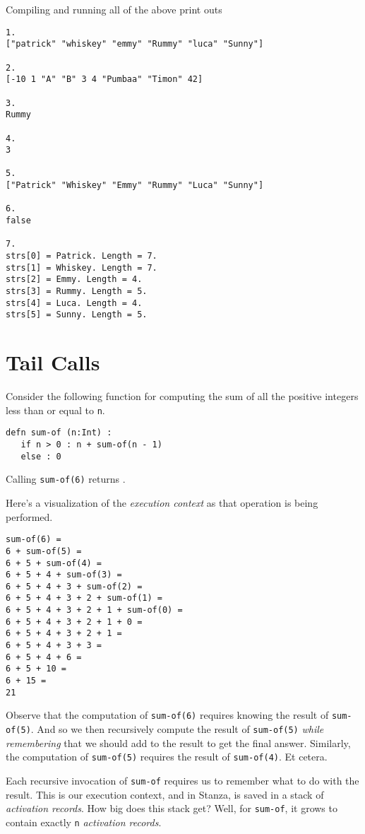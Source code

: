 \documentclass[10pt,oneside]{book}
\begin{document}
Compiling and running all of the above print outs
\begin{lstlisting}
1.
["patrick" "whiskey" "emmy" "Rummy" "luca" "Sunny"]

2.
[-10 1 "A" "B" 3 4 "Pumbaa" "Timon" 42]

3.
Rummy

4.
3

5.
["Patrick" "Whiskey" "Emmy" "Rummy" "Luca" "Sunny"]

6.
false

7.
strs[0] = Patrick. Length = 7.
strs[1] = Whiskey. Length = 7.
strs[2] = Emmy. Length = 4.
strs[3] = Rummy. Length = 5.
strs[4] = Luca. Length = 4.
strs[5] = Sunny. Length = 5.
\end{lstlisting}

\section{Tail Calls}
Consider the following function for computing the sum of all the positive integers less than or equal to \texttt{\frenchspacing n}.
\begin{lstlisting}
defn sum-of (n:Int) :
   if n > 0 : n + sum-of(n - 1)
   else : 0
\end{lstlisting}
Calling \texttt{\frenchspacing sum-of(6)} returns \texttt{}.

Here's a visualization of the {\em execution context} as that operation is being performed.
\begin{lstlisting}
sum-of(6) =
6 + sum-of(5) =
6 + 5 + sum-of(4) =
6 + 5 + 4 + sum-of(3) =
6 + 5 + 4 + 3 + sum-of(2) =
6 + 5 + 4 + 3 + 2 + sum-of(1) =
6 + 5 + 4 + 3 + 2 + 1 + sum-of(0) =
6 + 5 + 4 + 3 + 2 + 1 + 0 =
6 + 5 + 4 + 3 + 2 + 1 =                  
6 + 5 + 4 + 3 + 3 =                  
6 + 5 + 4 + 6 =                  
6 + 5 + 10 =                  
6 + 15 =                  
21
\end{lstlisting}
Observe that the computation of \texttt{\frenchspacing sum-of(6)} requires knowing the result of \texttt{\frenchspacing sum-of(5)}. And so we then recursively compute the result of \texttt{\frenchspacing sum-of(5)} {\em while remembering} that we should add \texttt{} to the result to get the final answer. Similarly, the computation of \texttt{\frenchspacing sum-of(5)} requires the result of \texttt{\frenchspacing sum-of(4)}. Et cetera. 

Each recursive invocation of \texttt{\frenchspacing sum-of} requires us to remember what to do with the result. This is our execution context, and in Stanza, is saved in a stack of {\em activation records}. How big does this stack get? Well, for \texttt{\frenchspacing sum-of}, it grows to contain exactly \texttt{\frenchspacing n} {\em activation records}. 
\end{document}
